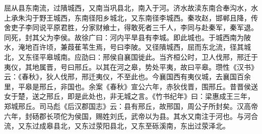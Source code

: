 \documentclass[12pt,UTF8]{ctexbook}
\begin{document}
屈从县东南流，过隤城西，又南当巩县北，南入于河。济水故渎东南合奉沟水，水上承朱沟于野王城西，东南径阳乡城北，又东南径李城西。秦攻赵，邯郸且降，传舍吏子李同说平原君胜，分家财飨士，得敢死者三千人，李同与赴秦军，秦军退。同死，封其父为李侯。故徐广曰：河内平旱县有李城。即此城也。于城西南为陂水，淹地百许顷，兼葭萑苇生焉，号曰李陂。又径隤城西，屈而东北流，径其城北，又东径平皋城南。应劭曰：邢侯自襄国徙此。当齐桓公时，卫人伐邢，邢迁于夷仪，其地属晋，号曰邢丘。以其在河之皋，势处平夷，故曰平皋。瓒性《汉书》云：《春秋》，狄人伐邢，邢迁夷仪，不至此也。今襄国西有夷仪城，去襄国百余里，平皋是邢丘，非国也。余案《春秋》宣公六年，赤狄伐晋，围邢丘。昔晋侯送女于楚，送之邢丘，即是此处也，非无城之言。《竹书纪年》曰：梁惠成王三年，郑城邢丘。司马彪《后汉郡国志》云：县有邢丘，故邢国，周公子所封矣。汉高帝六年，封砀郡长项佗为侯国，赐姓刘氏，武帝以为县。其水又南注于河也。与河合流，又东过成皋县北，又东过荥阳县北，又东至砾溪南，东出过荥泽北。
\end{document}
